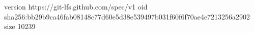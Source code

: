 version https://git-lfs.github.com/spec/v1
oid sha256:bb29b9ca46fab08148c77d60e5d38e539497b031f60f6f70ae4e7213256a2902
size 10239
